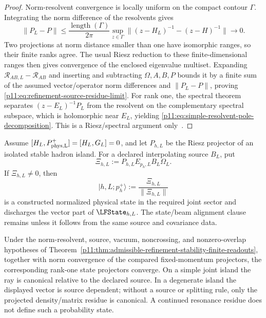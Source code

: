 \documentclass[12pt,a4paper]{article}
\begin{document}
\begin{proof}
Norm-resolvent convergence is locally uniform on the compact contour
\(\Gamma\).  Integrating the norm difference of the resolvents gives
\begin{equation}
\|P_L-P\|
\le\frac{\operatorname{length}(\Gamma)}{2\pi}
\sup_{z\in\Gamma}
\|(z-H_L)^{-1}-(z-H)^{-1}\|\longrightarrow0.
\end{equation}
Two projections at norm distance smaller than one have isomorphic ranges, so
their finite ranks agree.  The usual Riesz reduction to these finite-dimensional
ranges then gives convergence of the enclosed eigenvalue multiset.  Expanding
\(\mathcal R_{AB,L}-\mathcal R_{AB}\) and inserting and subtracting
\(\Omega,A,B,P\) bounds it by a finite sum of the assumed vector/operator norm
differences and \(\|P_L-P\|\), proving
\eqref{p11:eq:refinement-source-residue-limit}.  For rank one, the spectral
theorem separates \((z-E_L)^{-1}P_L\) from the resolvent on the complementary
spectral subspace, which is holomorphic near \(E_L\), yielding
\eqref{p11:eq:simple-resolvent-pole-decomposition}.  This is a Riesz/spectral
argument only~\cite{Kato1950,ReedSimonII1975}.
\end{proof}

\begin{corollary}
\label{p11:cor:source-selected-fixed-momentum-state}
Assume \([H_L,P_{\rm phys,L}^+]=[H_L,G_L]=0\), and let \(P_{h,L}\) be the Riesz projector of an
isolated stable hadron island.  For a declared interpolating source \(B_L\),
put
\begin{equation}
\label{p11:eq:source-selected-fixed-momentum-vector}
 \Xi_{h,L}:=P_{h,L}E_{p_h,L}B_L\Omega_L .
\end{equation}
If \(\Xi_{h,L}\ne0\), then
\begin{equation}
\label{p11:eq:source-selected-fixed-momentum-state}
 \boxed{
 |h,L;p_h^+\rangle
 :=\frac{\Xi_{h,L}}{\|\Xi_{h,L}\|}}
\end{equation}
is a constructed normalized physical state in the required joint sector and
discharges the vector part of \(\LFState_{h,L}\).  The state/beam alignment
clause remains unless it follows from the same source and covariance data.

Under the norm-resolvent, source, vacuum, noncrossing, and nonzero-overlap
hypotheses of
Theorem~\ref{p11:thm:admissible-refinement-stability-finite-readouts}, together
with norm convergence of the compared fixed-momentum projectors, the
corresponding rank-one state projectors converge.  On a simple joint island
the ray is canonical relative to the declared source.  In a degenerate island
the displayed vector is source dependent; without a source or splitting rule,
only the projected density/matrix residue is canonical.  A continued resonance
residue does not define such a probability state.
\end{corollary}
\end{document}
